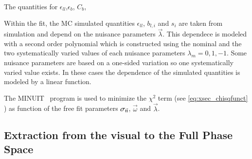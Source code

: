 The quantities for $\epsilon_{ll}$,$\epsilon_b$, $C_b$, 

Within the fit, the MC simulated quantities $\epsilon_{ll}$, $b_{l,i}$ and $s_{i}$ are taken from simulation and depend on the nuisance parameters $\vec{\lambda}$.
This dependece is modeled with a second order polynomial which is constructed using the nominal and the two systematically varied values of each nuisance parameters $\lambda_m=0,1,-1$.
Some nuisance parameters are based on a one-sided variation so one systematically varied value exists. In these cases the dependence of the simulated quantities is modeled by a linear function.

The MINUIT~\cite{James:1975dr} program is used to minimize the  $\chi^2$ term (see \ref{eq:xsec_chisqfunct} ) as function of the free fit parameters $\sigma_\mathrm{t\bar{t}}$, $\vec{\omega}$
and $\vec{\lambda}$. 


\subsection{Extraction from the visual to the Full Phase Space}
\label{sec:xsec_extraction}

